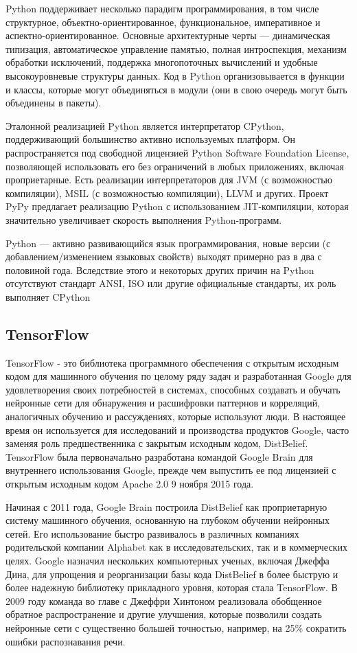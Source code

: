 Python поддерживает несколько парадигм программирования, в том числе структурное, объектно-ориентированное, функциональное, императивное и аспектно-ориентированное. Основные архитектурные черты — динамическая типизация, автоматическое управление памятью, полная интроспекция, механизм обработки исключений, поддержка многопоточных вычислений и удобные высокоуровневые структуры данных. Код в Python организовывается в функции и классы, которые могут объединяться в модули (они в свою очередь могут быть объединены в пакеты).

Эталонной реализацией Python является интерпретатор CPython, поддерживающий большинство активно используемых платформ. Он рас\-прос\-тра\-ня\-ет\-ся под свободной лицензией Python Software Foundation License, позволяющей использовать его без ограничений в любых приложениях, включая проприетарные. Есть реализации интерпретаторов для JVM (с возможностью компиляции), MSIL (с возможностью компиляции), LLVM и других. Проект PyPy предлагает реализацию Python с использованием JIT-компиляции, которая значительно увеличивает скорость выполнения Python-программ.

Python — активно развивающийся язык программирования, новые версии (с добавлением/изменением языковых свойств) выходят примерно раз в два с половиной года. Вследствие этого и некоторых других причин на Python отсутствуют стандарт ANSI, ISO или другие официальные стандарты, их роль выполняет CPython

\subsection{TensorFlow}
\label{sec:development:tensorflow}

TensorFlow - это библиотека программного обеспечения с открытым исходным кодом для машинного обучения по целому ряду задач и разработанная Google для удовлетворения своих потребностей в системах, способных создавать и обучать нейронные сети для обнаружения и расшифровки паттернов и корреляций, аналогичных обучению и рассуждениях, которые используют люди. В настоящее время он используется для исследований и производства продуктов Google, часто заменяя роль предшественника с закрытым исходным кодом, DistBelief. TensorFlow была первоначально разработана командой Google Brain для внутреннего использования Google, прежде чем выпустить ее под лицензией с открытым исходным кодом Apache 2.0 9 ноября 2015 года.

Начиная с 2011 года, Google Brain построила DistBelief как проприетарную систему машинного обучения, основанную на глубоком обучении нейронных сетей. Его использование быстро развивалось в различных компаниях родительской компании Alphabet как в исследовательских, так и в коммерческих целях. Google назначил нескольких компьютерных ученых, включая Джеффа Дина, для упрощения и реорганизации базы кода DistBelief в более быструю и более надежную библиотеку прикладного уровня, которая стала TensorFlow. В 2009 году команда во главе с Джеффри Хинтоном реализовала обобщенное обратное распространение и другие улучшения, которые позволили создать нейронные сети с существенно большей точностью, например, на 25\% сократить ошибки распознавания речи.

